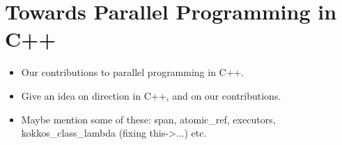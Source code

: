 
\section{Towards Parallel Programming in C++}\label{chap:c++}

\begin{itemize}
\item Our contributions to parallel programming in C++. 
\item Give an idea on direction in C++, and on our contributions.
\item Maybe mention some of these: span, atomic\_ref, executors, kokkos\_class\_lambda (fixing this->...) etc.
\end{itemize}
